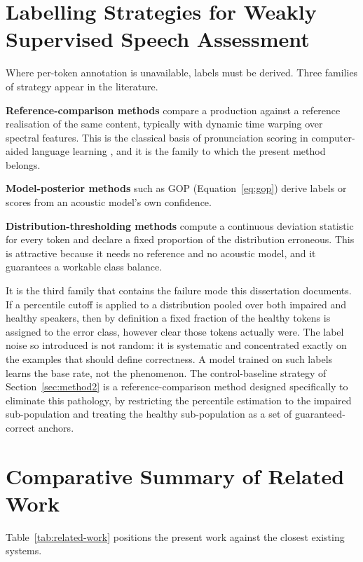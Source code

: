\section{Labelling Strategies for Weakly Supervised Speech Assessment}
\label{sec:lit-labelling}

Where per-token annotation is unavailable, labels must be derived. Three
families of strategy appear in the literature.

\textbf{Reference-comparison methods} compare a production against a reference
realisation of the same content, typically with dynamic time warping over
spectral features. This is the classical basis of pronunciation scoring in
computer-aided language learning \cite{neri2002feedback}, and it is the family
to which the present method belongs.

\textbf{Model-posterior methods} such as GOP (Equation~\eqref{eq:gop}) derive
labels or scores from an acoustic model's own confidence.

\textbf{Distribution-thresholding methods} compute a continuous deviation
statistic for every token and declare a fixed proportion of the distribution
erroneous. This is attractive because it needs no reference and no acoustic
model, and it guarantees a workable class balance.

It is the third family that contains the failure mode this dissertation
documents. If a percentile cutoff is applied to a distribution pooled over both
impaired and healthy speakers, then by definition a fixed fraction of the
healthy tokens is assigned to the error class, however clear those tokens
actually were. The label noise so introduced is not random: it is systematic
and concentrated exactly on the examples that should define correctness. A
model trained on such labels learns the base rate, not the phenomenon. The
control-baseline strategy of Section~\ref{sec:method2} is a reference-comparison
method designed specifically to eliminate this pathology, by restricting the
percentile estimation to the impaired sub-population and treating the healthy
sub-population as a set of guaranteed-correct anchors.

\section{Comparative Summary of Related Work}
\label{sec:lit-summary}

Table~\ref{tab:related-work} positions the present work against the closest
existing systems.


